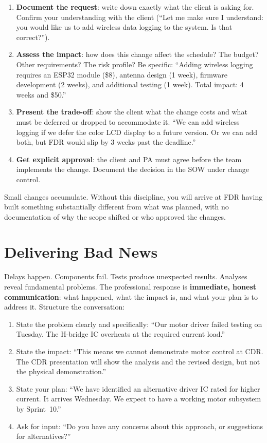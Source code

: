 \begin{enumerate}[nosep,leftmargin=1.5em]
\item \textbf{Document the request}: write down exactly what the client is asking for. Confirm your understanding with the client (``Let me make sure I understand: you would like us to add wireless data logging to the system. Is that correct?'').
\item \textbf{Assess the impact}: how does this change affect the schedule? The budget? Other requirements? The risk profile? Be specific: ``Adding wireless logging requires an ESP32 module (\$8), antenna design (1 week), firmware development (2 weeks), and additional testing (1 week). Total impact: 4 weeks and \$50.''
\item \textbf{Present the trade-off}: show the client what the change costs and what must be deferred or dropped to accommodate it. ``We can add wireless logging if we defer the color LCD display to a future version. Or we can add both, but FDR would slip by 3 weeks past the deadline.''
\item \textbf{Get explicit approval}: the client and PA must agree before the team implements the change. Document the decision in the SOW under change control.
\end{enumerate}

Small changes accumulate. Without this discipline, you will arrive at FDR having built something substantially different from what was planned, with no documentation of why the scope shifted or who approved the changes.

\section{Delivering Bad News}
Delays happen. Components fail. Tests produce unexpected results. Analyses reveal fundamental problems. The professional response is \textbf{immediate, honest communication}: what happened, what the impact is, and what your plan is to address it. Structure the conversation:

\begin{enumerate}[nosep,leftmargin=1.5em]
\item State the problem clearly and specifically: ``Our motor driver failed testing on Tuesday. The H-bridge IC overheats at the required current load.''
\item State the impact: ``This means we cannot demonstrate motor control at CDR. The CDR presentation will show the analysis and the revised design, but not the physical demonstration.''
\item State your plan: ``We have identified an alternative driver IC rated for higher current. It arrives Wednesday. We expect to have a working motor subsystem by Sprint~10.''
\item Ask for input: ``Do you have any concerns about this approach, or suggestions for alternatives?''
\end{enumerate}


